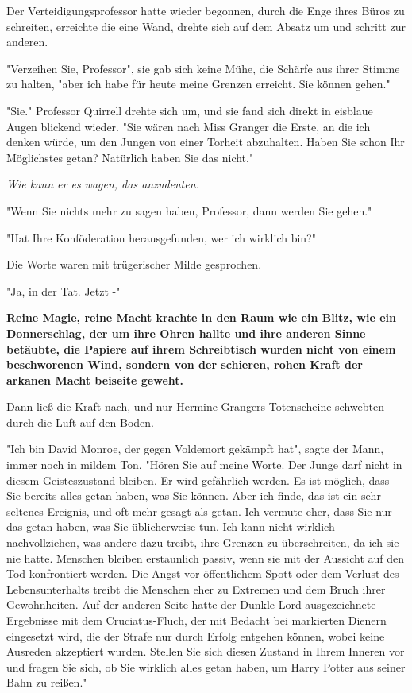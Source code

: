 {Der Verteidigungsprofessor hatte wieder begonnen, durch die Enge ihres Büros zu schreiten, erreichte die eine Wand, drehte sich auf dem Absatz um und schritt zur anderen.

"Verzeihen Sie, Professor", sie gab sich keine Mühe, die Schärfe aus ihrer Stimme zu halten, "aber ich habe für heute meine Grenzen erreicht. Sie können gehen."

"Sie." Professor Quirrell drehte sich um, und sie fand sich direkt in eisblaue Augen blickend wieder. "Sie wären nach Miss Granger die Erste, an die ich denken würde, um den Jungen von einer Torheit abzuhalten. Haben Sie schon Ihr Möglichstes getan? Natürlich haben Sie das nicht."

\emph{Wie kann er es wagen, das anzudeuten.}

"Wenn Sie nichts mehr zu sagen haben, Professor, dann werden Sie gehen."

"Hat Ihre Konföderation herausgefunden, wer ich wirklich bin?"

Die Worte waren mit trügerischer Milde gesprochen.

"Ja, in der Tat. Jetzt -"

\textbf{Reine Magie, reine Macht krachte in den Raum wie ein Blitz, wie ein Donnerschlag, der um ihre Ohren hallte und ihre anderen Sinne betäubte, die Papiere auf ihrem Schreibtisch wurden nicht von einem beschworenen Wind, sondern von der schieren, rohen Kraft der arkanen Macht beiseite geweht.}

Dann ließ die Kraft nach, und nur Hermine Grangers Totenscheine schwebten durch die Luft auf den Boden.

"Ich bin David Monroe, der gegen Voldemort gekämpft hat", sagte der Mann, immer noch in mildem Ton. "Hören Sie auf meine Worte. Der Junge darf nicht in diesem Geisteszustand bleiben. Er wird gefährlich werden. Es ist möglich, dass Sie bereits alles getan haben, was Sie können. Aber ich finde, das ist ein sehr seltenes Ereignis, und oft mehr gesagt als getan. Ich vermute eher, dass Sie nur das getan haben, was Sie üblicherweise tun. Ich kann nicht wirklich nachvollziehen, was andere dazu treibt, ihre Grenzen zu überschreiten, da ich sie nie hatte. Menschen bleiben erstaunlich passiv, wenn sie mit der Aussicht auf den Tod konfrontiert werden. Die Angst vor öffentlichem Spott oder dem Verlust des Lebensunterhalts treibt die Menschen eher zu Extremen und dem Bruch ihrer Gewohnheiten. Auf der anderen Seite hatte der Dunkle Lord ausgezeichnete Ergebnisse mit dem Cruciatus-Fluch, der mit Bedacht bei markierten Dienern eingesetzt wird, die der Strafe nur durch Erfolg entgehen können, wobei keine Ausreden akzeptiert wurden. Stellen Sie sich diesen Zustand in Ihrem Inneren vor und fragen Sie sich, ob Sie wirklich alles getan haben, um Harry Potter aus seiner Bahn zu reißen."

}
